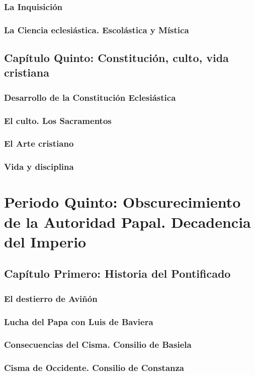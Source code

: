 \raggedbottom{} \documentclass[12pt, a4paper]{book}
\begin{document}
\section{La Inquisición}
\section{La Ciencia eclesiástica. Escolástica y Mística}
\chapter{Capítulo Quinto: Constitución, culto, vida cristiana}
\section{Desarrollo de la Constitución Eclesiástica}
\section{El culto. Los Sacramentos}
\section{El Arte cristiano}
\section{Vida y disciplina}
\part{Periodo Quinto: Obscurecimiento de la Autoridad Papal. Decadencia del Imperio}
\chapter{Capítulo Primero: Historia del Pontificado}
\section{El destierro de Aviñón}
\section{Lucha del Papa con Luis de Baviera}
\section{Consecuencias del Cisma. Consilio de Basiela}
\section{Cisma de Occidente. Consilio de Constanza}
\end{document}
